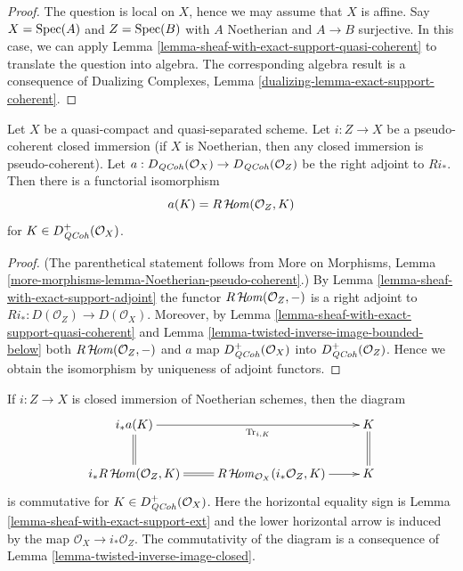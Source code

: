 \begin{proof}
The question is local on $X$, hence we may assume that $X$ is affine.
Say $X = \mathop{\mathrm{Spec}}(A)$ and $Z = \mathop{\mathrm{Spec}}(B)$ with $A$ Noetherian and
$A \to B$ surjective. In this case, we can apply
Lemma \ref{lemma-sheaf-with-exact-support-quasi-coherent}
to translate the question into algebra.
The corresponding algebra result is a consequence of
Dualizing Complexes, Lemma \ref{dualizing-lemma-exact-support-coherent}.
\end{proof}

\begin{lemma}
\label{lemma-twisted-inverse-image-closed}
Let $X$ be a quasi-compact and quasi-separated scheme.
Let $i : Z \to X$ be a pseudo-coherent closed immersion
(if $X$ is Noetherian, then any closed immersion is pseudo-coherent).
Let $a : D_{\mathit{QCoh}}(\mathcal{O}_X) \to D_{\mathit{QCoh}}(\mathcal{O}_Z)$ be the
right adjoint to $Ri_*$. Then there is a functorial isomorphism
$$
a(K) = R\mathop{\mathcal{H}\!\mathit{om}}\nolimits(\mathcal{O}_Z, K)
$$
for $K \in D_{\mathit{QCoh}}^+(\mathcal{O}_X)$.
\end{lemma}

\begin{proof}
(The parenthetical statement follows from More on Morphisms, Lemma
\ref{more-morphisms-lemma-Noetherian-pseudo-coherent}.)
By Lemma \ref{lemma-sheaf-with-exact-support-adjoint}
the functor $R\mathop{\mathcal{H}\!\mathit{om}}\nolimits(\mathcal{O}_Z, -)$ is a right adjoint
to $Ri_* : D(\mathcal{O}_Z) \to D(\mathcal{O}_X)$. Moreover,
by Lemma \ref{lemma-sheaf-with-exact-support-quasi-coherent}
and Lemma \ref{lemma-twisted-inverse-image-bounded-below}
both $R\mathop{\mathcal{H}\!\mathit{om}}\nolimits(\mathcal{O}_Z, -)$ and $a$ map
$D_{\mathit{QCoh}}^+(\mathcal{O}_X)$ into $D_{\mathit{QCoh}}^+(\mathcal{O}_Z)$.
Hence we obtain the isomorphism by uniqueness of adjoint
functors.
\end{proof}

\begin{example}
\label{example-trace-closed-immersion}
If $i : Z \to X$ is closed immersion of Noetherian schemes, then
the diagram
$$
\xymatrix{
i_*a(K) \ar[rr]_-{\text{Tr}_{i, K}} \ar@{=}[d] & &
K \ar@{=}[d] \\
i_*R\SheafHom(\mathcal{O}_Z, K) \ar@{=}[r] &
R\SheafHom_{\mathcal{O}_X}(i_*\mathcal{O}_Z, K)
\ar[r] & K
}
$$
is commutative for $K \in D_{\mathit{QCoh}}^+(\mathcal{O}_X)$.
Here the horizontal equality sign is
Lemma \ref{lemma-sheaf-with-exact-support-ext} and the
lower horizontal arrow is induced
by the map $\mathcal{O}_X \to i_*\mathcal{O}_Z$. The commutativity
of the diagram is a consequence of
Lemma \ref{lemma-twisted-inverse-image-closed}.
\end{example}




